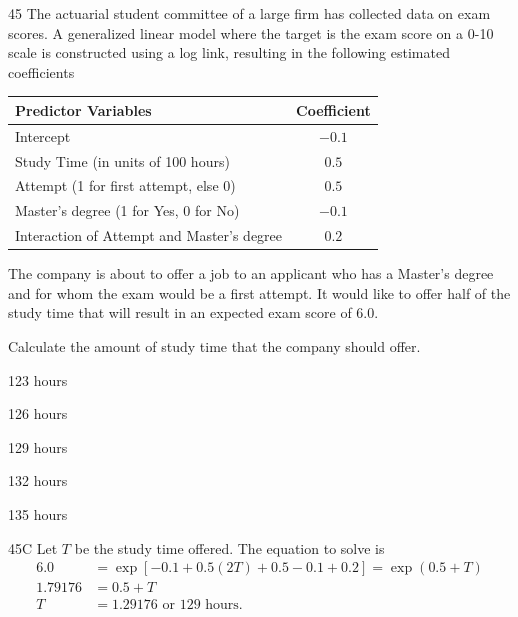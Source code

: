 \begin{question}{45}
The actuarial student committee of a large firm has collected data on exam scores. A generalized linear model where the target is the exam score on a 0-10 scale is constructed using a log link, resulting in the following estimated coefficients

\begin{center}
\begin{tabular}{|l|c|}
\hline
Predictor Variables & Coefficient \\ \hline
Intercept & $-0.1$ \\ \hline
Study Time (in units of 100 hours) & $0.5$ \\ \hline
Attempt (1 for first attempt, else 0) & $0.5$ \\ \hline
Master's degree (1 for Yes, 0 for No) & $-0.1$ \\ \hline
Interaction of Attempt and Master's degree & $0.2$ \\ \hline
\end{tabular}
\end{center}

The company is about to offer a job to an applicant who has a Master's degree and for whom the exam would be a first attempt. It would like to offer half of the study time that will result in an expected exam score of 6.0.

Calculate the amount of study time that the company should offer.

\begin{choices}
\item 123 hours
\item 126 hours
\item 129 hours
\item 132 hours
\item 135 hours
\end{choices}
\end{question}
\begin{solution}{45}{C}
Let $T$ be the study time offered. The equation to solve is
\begin{align*}
6.0 &= \exp[-0.1 + 0.5(2T) + 0.5 - 0.1 + 0.2] = \exp(0.5 + T) \\
1.79176 &= 0.5 + T \\
T &= 1.29176 \text{ or } 129 \text{ hours.}
\end{align*}
\end{solution}

